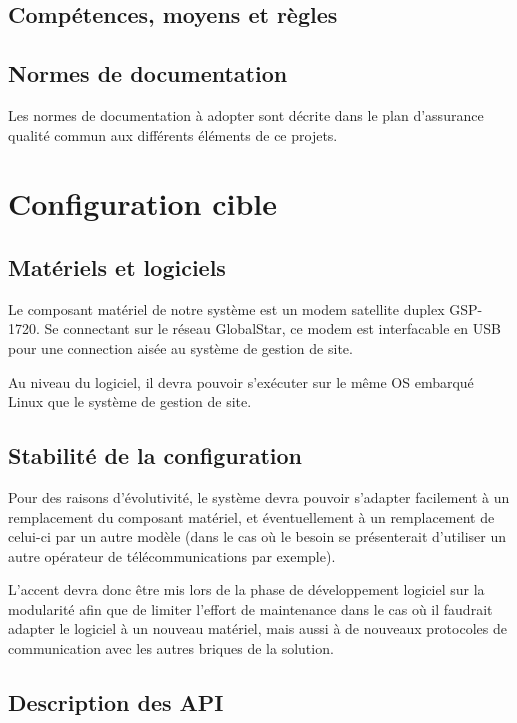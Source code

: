 \subsection{Compétences, moyens et règles}



\subsection{Normes de documentation}

Les normes de documentation à adopter sont décrite dans le plan d'assurance qualité commun aux différents éléments de ce projets.

\section{Configuration cible}

\subsection{Matériels et logiciels}

Le composant matériel de notre système est un modem satellite duplex GSP-1720. Se connectant sur le réseau GlobalStar, ce modem est interfacable en USB pour une connection aisée au système de gestion de site.

Au niveau du logiciel, il devra pouvoir s'exécuter sur le même OS embarqué Linux que le système de gestion de site.

\subsection{Stabilité de la configuration}

Pour des raisons d'évolutivité, le système devra pouvoir s'adapter facilement à un remplacement du composant matériel, et éventuellement à un remplacement de celui-ci par un autre modèle (dans le cas où le besoin se présenterait d'utiliser un autre opérateur de télécommunications par exemple).

L'accent devra donc être mis lors de la phase de développement logiciel sur la modularité afin que de limiter l'effort de maintenance dans le cas où il faudrait adapter le logiciel à un nouveau matériel, mais aussi à de nouveaux protocoles de communication avec les autres briques de la solution.

\subsection{Description des API}

